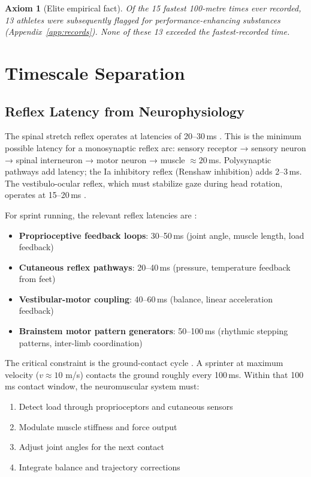 \documentclass[11pt,twocolumn]{article}
\newtheorem{axiom}[theorem]{Axiom}
\theoremstyle{definition}
\theoremstyle{remark}
\begin{document}
\begin{axiom}[Elite empirical fact]
\label{ax:elite-fact}
Of the 15 fastest 100-metre times ever recorded, 13 athletes were subsequently flagged for performance-enhancing substances (Appendix~\ref{app:records}). None of these 13 exceeded the fastest-recorded time.
\end{axiom}

\section{Timescale Separation}
\label{sec:timescale}

\subsection{Reflex Latency from Neurophysiology}

The spinal stretch reflex operates at latencies of 20--30\,ms \cite{sherrington1925integrative,eccles1957physiology}. This is the minimum possible latency for a monosynaptic reflex arc: sensory receptor → sensory neuron → spinal interneuron → motor neuron → muscle $\approx 20$\,ms. Polysynaptic pathways add latency; the Ia inhibitory reflex (Renshaw inhibition) adds 2--3\,ms. The vestibulo-ocular reflex, which must stabilize gaze during head rotation, operates at 15--20\,ms \cite{kandel2013principles}.

For sprint running, the relevant reflex latencies are \cite{enoka2015neuromechanics,winter2009biomechanics,novacheck1998biomechanics}:
\begin{itemize}[leftmargin=1.2em]
\item \textbf{Proprioceptive feedback loops}: 30--50\,ms (joint angle, muscle length, load feedback)
\item \textbf{Cutaneous reflex pathways}: 20--40\,ms (pressure, temperature feedback from feet)
\item \textbf{Vestibular-motor coupling}: 40--60\,ms (balance, linear acceleration feedback)
\item \textbf{Brainstem motor pattern generators}: 50--100\,ms (rhythmic stepping patterns, inter-limb coordination)
\end{itemize}

The critical constraint is the ground-contact cycle \cite{cavagna1977mechanical,kram1990energetics,bolt2008}. A sprinter at maximum velocity ($v \approx 10$ m/s) contacts the ground roughly every 100\,ms. Within that 100\,ms contact window, the neuromuscular system must:
\begin{enumerate}[leftmargin=1.2em]
\item Detect load through proprioceptors and cutaneous sensors
\item Modulate muscle stiffness and force output
\item Adjust joint angles for the next contact
\item Integrate balance and trajectory corrections
\end{enumerate}
\end{document}
